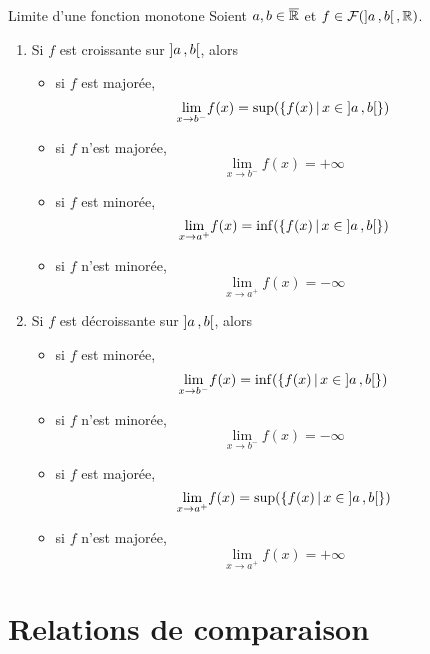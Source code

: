     \begin{theo}{Limite d’une fonction monotone}{}
        Soient $a,b \in \overline{\mathbb{R}}$ et $f \in \mathcal{F}(\left] a \, , b \right[,\mathbb{R})$.
        \begin{enumerate}
            \item Si $f$ est croissante sur $\left] a \, , b \right[$, alors 
            \begin{itemize}
                \item si $f$ est majorée, 
                \[ \underset{x \rightarrow b^-}{\lim} f(x) = \sup(\left\{ f(x) \, | \, x \in \left] a \, , b \right[ \right\}) \]
                \item si $f$ n’est majorée, 
                \[ \underset{x \rightarrow b^-}{\lim} f(x) = +\infty \]
                \item si $f$ est minorée, 
                \[ \underset{x \rightarrow a^+}{\lim} f(x) = \inf(\left\{ f(x) \, | \, x \in \left] a \, , b \right[ \right\}) \]
                \item si $f$ n’est minorée, 
                \[ \underset{x \rightarrow a^+}{\lim} f(x) = -\infty \]
            \end{itemize}
            \item Si $f$ est décroissante sur $\left] a \, , b \right[$, alors 
            \begin{itemize}
                \item si $f$ est minorée,
                \[ \underset{x \rightarrow b^-}{\lim} f(x) = \inf(\left\{ f(x) \, | \, x \in \left] a \, , b \right[ \right\}) \]
                \item si $f$ n’est minorée, 
                \[ \underset{x \rightarrow b^-}{\lim} f(x) = -\infty \]
                \item si $f$ est majorée, 
                \[ \underset{x \rightarrow a^+}{\lim} f(x) = \sup(\left\{ f(x) \, | \, x \in \left] a \, , b \right[ \right\}) \]
                \item si $f$ n’est majorée, 
                \[ \underset{x \rightarrow a^+}{\lim} f(x) = +\infty \]
            \end{itemize}
        \end{enumerate}
    \end{theo}

\section{Relations de comparaison}

